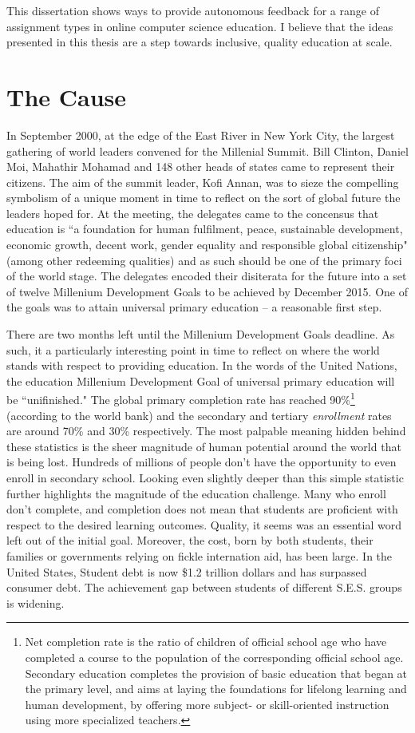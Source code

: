 This dissertation shows ways to provide autonomous feedback for a range of assignment types in online computer science education. I believe that the ideas presented in this thesis are a step towards inclusive, quality education at scale.

\section{The Cause}

In September 2000, at the edge of the East River in New York City, the largest gathering of world leaders convened for the Millenial Summit. Bill Clinton, Daniel Moi, Mahathir Mohamad and 148 other heads of states came to represent their citizens. The aim of the summit leader, Kofi Annan, was to sieze the compelling symbolism of a unique moment in time to reflect on the sort of global future the leaders hoped for. At the meeting, the delegates came to the concensus that education is ``a foundation for human fulfilment, peace, sustainable development, economic
growth, decent work, gender equality and responsible global citizenship" (among other redeeming qualities) and as such should be one of the primary foci of the world stage. The delegates encoded their disiterata for the future into a set of twelve Millenium Development Goals to be achieved by December 2015. One of the goals was to attain universal primary education -- a reasonable first step. 

There are two months left until the Millenium Development Goals deadline. As such, it a particularly interesting point in time to reflect on where the world stands with respect to providing education. In the words of the United Nations, the education Millenium Development Goal of universal primary education will be ``unifinished." The global primary completion rate has reached 90\%\footnote{Net completion rate is the ratio of children of official school age who have completed a course to the population of the corresponding official school age. Secondary education completes the provision of basic education that began at the primary level, and aims at laying the foundations for lifelong learning and human development, by offering more subject- or skill-oriented instruction using more specialized teachers.} (according to the world bank) and the secondary and tertiary \emph{enrollment} rates are around 70\% and 30\% respectively. The most palpable meaning hidden behind these statistics is the sheer magnitude of human potential around the world that is being lost. Hundreds of millions of people don't have the opportunity to even enroll in secondary school. Looking even slightly deeper than this simple statistic further highlights the magnitude of the education challenge. Many who enroll don't complete, and completion does not mean that students are proficient with respect to the desired learning outcomes. Quality, it seems was an essential word left out of the initial goal. Moreover, the cost, born by both students, their families or governments relying on fickle internation aid, has been large. In the United States, Student debt is now \$1.2 trillion dollars and has surpassed consumer debt. The achievement gap between students of different S.E.S. groups is widening.

